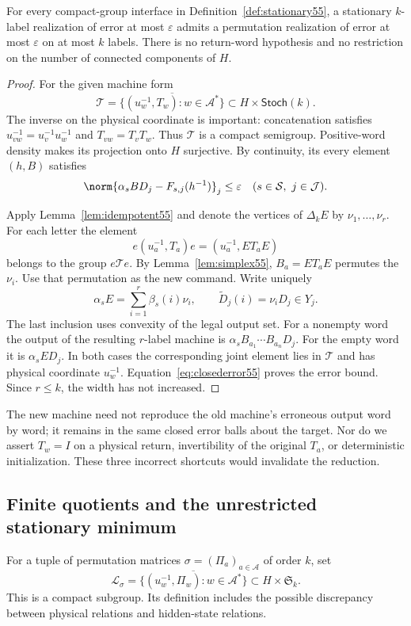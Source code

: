 \begin{theorem}\label{thm:purification55}
For every compact-group interface in Definition~\ref{def:stationary55}, a stationary $k$-label realization of error at most $\varepsilon$ admits a permutation realization of error at most $\varepsilon$ on at most $k$ labels. There is no return-word hypothesis and no restriction on the number of connected components of $H$.
\end{theorem}
\begin{proof}
For the given machine form
\[
 \mathcal T=\overline{\{(u_w^{-1},T_w):w\in\mathcal A^*\}}
       \subset H\times\mathsf{Stoch}(k).
\]
The inverse on the physical coordinate is important: concatenation satisfies $u_{vw}^{-1}=u_v^{-1}u_w^{-1}$ and $T_{vw}=T_vT_w$. Thus $\mathcal T$ is a compact semigroup. Positive-word density makes its projection onto $H$ surjective. By continuity, its every element $(h,B)$ satisfies
\begin{equation}\label{eq:closederror55}
             \norm{\alpha_sBD_j-F_{s,j}(h^{-1})}_j\le\varepsilon
             \quad(s\in\mathcal S,\ j\in\mathcal J).
\end{equation}

Apply Lemma~\ref{lem:idempotent55} and denote the vertices of $\Delta_k E$ by $\nu_1,\ldots,\nu_r$. For each letter the element
\[
        e(u_a^{-1},T_a)e=(u_a^{-1},ET_aE)
\]
belongs to the group $e\mathcal T e$. By Lemma~\ref{lem:simplex55}, $B_a=ET_aE$ permutes the $\nu_i$. Use that permutation as the new command. Write uniquely
\[
          \alpha_sE=\sum_{i=1}^r\beta_s(i)\nu_i,
          \qquad \widetilde D_j(i)=\nu_iD_j\in Y_j.
\]
The last inclusion uses convexity of the legal output set. For a nonempty word the output of the resulting $r$-label machine is $\alpha_s B_{a_1}\cdots B_{a_n}D_j$. For the empty word it is $\alpha_sED_j$. In both cases the corresponding joint element lies in $\mathcal T$ and has physical coordinate $u_w^{-1}$. Equation~\eqref{eq:closederror55} proves the error bound. Since $r\le k$, the width has not increased.
\end{proof}
The new machine need not reproduce the old machine's erroneous output word by word; it remains in the same closed error balls about the target. Nor do we assert $T_{w}=I$ on a physical return, invertibility of the original $T_a$, or deterministic initialization. These three incorrect shortcuts would invalidate the reduction.

\subsection{Finite quotients and the unrestricted stationary minimum}
For a tuple of permutation matrices $\sigma=(\Pi_a)_{a\in\mathcal A}$ of order $k$, set
\[
 \mathcal L_\sigma=
 \overline{\{(u_w^{-1},\Pi_w):w\in\mathcal A^*\}}
       \subset H\times\mathfrak S_k.
\]
This is a compact subgroup. Its definition includes the possible discrepancy between physical relations and hidden-state relations.

